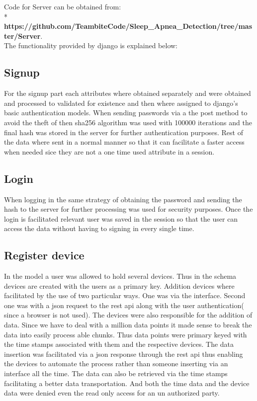 \documentclass{report}
\begin{document}
Code for Server can be obtained from:\\*
\textbf{https://github.com/TeambiteCode/Sleep\_Apnea\_Detection/tree/master/Server}.\\

The functionality provided by django is explained below:\\  
\subsection{Signup}                
    For the signup part each attributes where obtained separately and were obtained and processed to validated for existence and then where assigned to django's basic authentication models. When sending passwords via a the post method to avoid the theft of then sha256 algorithm was used with 100000 iterations and the final hash was stored in the server for further authentication purposes. Rest of the data where sent in a normal manner so that it can facilitate a faster access when needed sice they are not a one time used attribute in a session. 
\subsection{Login}                
    When logging in the same strategy of obtaining the password and sending the hash to the server for further processing was used for security purposes. Once the login is facilitated relevant user was saved in the session so that the user can access the data without having to signing in every single time. 
\subsection{Register device}              
    In the model a user was allowed to hold several devices. Thus in the schema devices are created with the users as a primary key. Addition devices where facilitated by the use of two particular ways. One was via the interface. Second one was with  a json request to the rest api along with the user authentication( since a browser is not used). The devices were also responsible for the addition of data. Since we have to deal with  a million data points it made sense to break the data into easily process able chunks. Thus data points were primary keyed with  the time stamps associated with them and the respective devices. The data insertion was facilitated via a json response through the rest api thus enabling the devices to automate the process rather than someone inserting via an interface all the time. The data can also be retrieved via the time stamps facilitating a better data transportation. And both the time data and the device data were denied even the read only access for an  un authorized party.    
\end{document}
